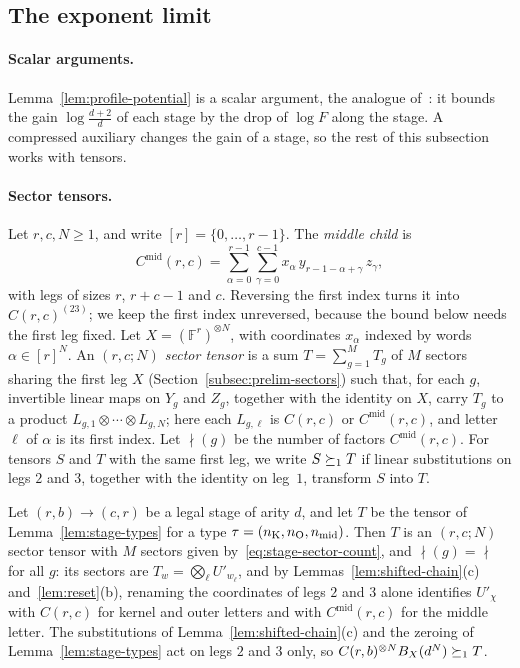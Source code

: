 \subsection{The exponent limit}
\label{subsec:limits-exponent}

\paragraph{Scalar arguments.}
Lemma~\ref{lem:profile-potential} is a scalar argument, the analogue
of~\citep[Remark~3.3]{FinCon26}: it bounds the gain
\(\log\frac{d+2}d\) of each stage by the drop of \(\log F\) along the
stage. A compressed auxiliary changes the gain of a stage, so the rest
of this subsection works with tensors.

\paragraph{Sector tensors.}
Let \(r,c,N\ge1\), and write \([r]=\{0,\ldots,r-1\}\). The \emph{middle
child} is
\[
 C^{\mathrm{mid}}(r,c)=\sum_{\alpha=0}^{r-1}\sum_{\gamma=0}^{c-1}
 x_\alpha\,y_{r-1-\alpha+\gamma}\,z_\gamma ,
\]
with legs of sizes \(r\), \(r+c-1\) and \(c\). Reversing the first
index turns it into \(C(r,c)^{(23)}\); we keep the first index
unreversed, because the bound below needs the first leg fixed. Let
\(X=(\mathbb F^r)^{\otimes N}\), with coordinates \(x_\alpha\) indexed by
words \(\alpha\in[r]^N\). An \emph{\((r,c;N)\) sector tensor} is a sum
\(T=\sum_{g=1}^MT_g\) of \(M\) sectors sharing the first leg \(X\)
(Section~\ref{subsec:prelim-sectors}) such that, for each \(g\),
invertible linear maps on \(Y_g\) and \(Z_g\), together with the
identity on \(X\), carry \(T_g\) to a product
\(L_{g,1}\otimes\cdots\otimes L_{g,N}\); here each \(L_{g,\ell}\) is
\(C(r,c)\) or \(C^{\mathrm{mid}}(r,c)\), and letter \(\ell\) of
\(\alpha\) is its first index. Let \(\nmid(g)\) be the number of factors
\(C^{\mathrm{mid}}(r,c)\). For tensors \(S\) and \(T\) with the same
first leg, we write \(S\succeq_1T\) if linear substitutions on legs \(2\)
and \(3\), together with the identity on leg~\(1\), transform \(S\) into
\(T\).

Let \((r,b)\to(c,r)\) be a legal stage of arity \(d\), and let \(T\) be
the tensor of Lemma~\ref{lem:stage-types} for a type
\(\tau=(n_{\mathrm K},n_{\mathrm O},n_{\mathrm{mid}})\). Then \(T\) is an \((r,c;N)\) sector tensor with
\(M\) sectors given by~\eqref{eq:stage-sector-count}, and
\(\nmid(g)=\nmid\) for all \(g\): its sectors are
\(T_w=\bigotimes_\ell U'_{w_\ell}\), and by
Lemmas~\ref{lem:shifted-chain}(c) and~\ref{lem:reset}(b), renaming the
coordinates of legs \(2\) and \(3\) alone identifies \(U'_\chi\) with
\(C(r,c)\) for kernel and outer letters and with
\(C^{\mathrm{mid}}(r,c)\) for the middle letter. The substitutions of
Lemma~\ref{lem:shifted-chain}(c) and the zeroing of
Lemma~\ref{lem:stage-types} act on legs \(2\) and \(3\) only, so
\(C(r,b)^{\otimes N}B_X(d^N)\succeq_1T\).

